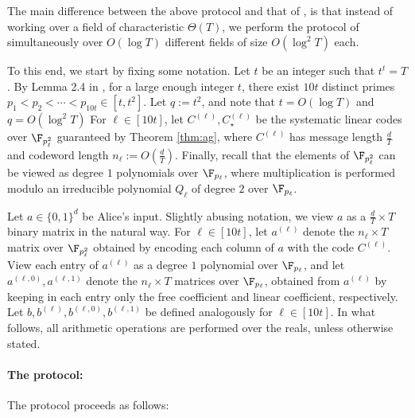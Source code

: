 \documentclass[11pt]{article}
\begin{document}
The main difference between the above protocol and that of \cite{CW19}, is that instead of working over a field of characteristic $\Theta(T)$, we perform the protocol of \cite{CW19} simultaneously over $O(\log T)$ different fields of size $O(\log^2T)$ each.

To this end, we start by fixing some notation.
Let $t$ be an integer such that $t^t=T$. By Lemma 2.4 in \cite{Che18}, for a large enough integer $t$, there exist $10 t$ distinct primes $p_{1} < p_2<\cdots < p_{10 t} \in [t,t^2]$.
Let $q:=t^2$, and note that $t = O(\log T)$ and $q = O(\log^2T)$
 For $\ell \in [10 t]$, let  $C^{(\ell)}, C_\star^{(\ell)}$  be the systematic linear codes over $\F_{p_\ell^2}$ guaranteed by Theorem \ref{thm:ag}, where $C^{(\ell)}$ has message length $\frac d T$ and codeword length $n_\ell:=O(\frac d T)$. 
 Finally, recall that the elements of $\F_{p_\ell^2}$ can be viewed as degree $1$ polynomials over $\F_{p_\ell}$, where multiplication is performed modulo an irreducible polynomial $Q_\ell$ of degree $2$ over $\F_{p_\ell}$. 
 
 Let $a \in\{0,1\}^{d}$ be Alice's input. Slightly abusing notation, we view $a$ as a $\frac d T \times T$ binary matrix in the natural way.
 For $\ell \in [10 t]$, let $a^{(\ell)}$ denote the  $ n_\ell \times T$ matrix over $\F_{p_\ell^2}$ obtained 
by encoding each column of 
$a$ with the code $C^{(\ell)}$. 
View each entry of $a^{(\ell)}$ as a degree $1$ polynomial over $\F_{p_\ell}$, and let $a^{(\ell,0)}, a^{(\ell,1)}$ denote the 
$n_\ell \times T$ matrices over $\F_{p_\ell}$, obtained from $a^{(\ell)}$ by keeping in each entry only the free coefficient and linear coefficient, respectively.
Let $b,b^{(\ell)}, b^{(\ell,0)}, b^{(\ell,1)}$ be defined analogously for $\ell \in [10 t]$. 
In what follows, all arithmetic operations are performed over the reals, unless otherwise stated.

 
\paragraph{The protocol:}

The protocol proceeds as follows:
\end{document}
